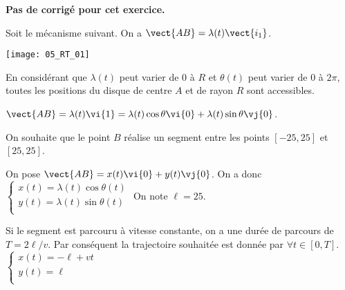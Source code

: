 \normaltrue
\correctionfalse


\setcounter{numques}{0}
\ifcorrection
\else
\textbf{Pas de corrigé pour cet exercice.}
\fi

\ifprof
\else
Soit le mécanisme suivant. On a $\vect{AB}=\lambda(t)\vect{i_1}$.
\begin{center}
\texttt{[image: 05\_RT\_01]}
\end{center}
\fi

\ifprof
En considérant que $\lambda(t)$ peut varier de 0 à $R$ et $\theta(t)$ peut varier de 0 à $2\pi$, toutes les positions du disque de centre $A$ et de rayon $R$ sont accessibles. 
\else
\fi

\ifprof
$\vect{AB}=\lambda(t) \vi{1} =\lambda(t) \cos \theta \vi{0} +\lambda(t) \sin \theta \vj{0}$.  
\else
\fi

On souhaite que le point $B$ réalise un segment entre les points $[-25,25]$ et $[25,25]$. 

\ifprof
On pose $\vect{AB} = x(t)\vi{0}+y(t)\vj{0}$. On a donc 
$\left\{
\begin{array}{l}
x(t) = \lambda(t) \cos \theta(t) \\
y(t) = \lambda(t) \sin \theta(t) \\
\end{array}
\right.$
On note $\ell = 25$. 

Si le segment est parcouru à vitesse constante, on a une durée de parcours de $T = 2\ell / v$. 
Par conséquent la trajectoire souhaitée est donnée par $\forall t \in [0,T]$. 
$\left\{
\begin{array}{l}
x(t) = -\ell+vt \\
y(t) = \ell \\
\end{array}
\right.
$

